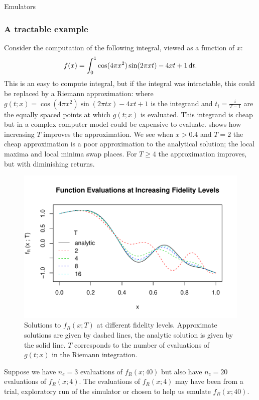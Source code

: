 \begin{chapter}{Emulators \label{Ch:Emulators}}
\subsubsection{A tractable example}
Consider the computation of the following integral, viewed as a function of $x$:
\begin{equation}
  f(x) = \int_0^1 \cos(4 \pi x^2)\sin(2 \pi xt) - 4xt + 1 \mathop{}\!\mathrm{d} t.
\end{equation}
This is an easy to compute integral, but if the integral was intractable, this could be replaced by a Riemann approximation:
where $g(t ; x) = \cos(4 \pi x^2)\sin(2 \pi t x) - 4xt + 1$ is the integrand and $t_i = \tfrac{i}{T-1}$ are the equally spaced points at which $g(t;x)$ is evaluated. This integrand is cheap but in a complex computer model could be expensive to evaluate.  shows how increasing $T$ improves the approximation. We see when $x>0.4$ and $T=2$ the cheap approximation is a poor approximation to the analytical solution; the local maxima and local minima swap places. For $T \geq 4$ the approximation improves, but with diminishing returns.
\begin{figure}[h]
  \centering
  \includegraphics{fig-emulators/fidelity.pdf}
  \caption{Solutions to $f_R(x;T)$ at different fidelity levels. Approximate solutions are given by dashed lines, the analytic solution is given by the solid line. $T$ corresponds to the number of evaluations of $g(t;x)$ in the Riemann integration.}
  \label{Fig:fidelity}
\end{figure}
Suppose we have $n_e = 3$ evaluations of $f_R(x; 40)$ but also have $n_c = 20$ evaluations of $f_R(x;4)$. The evaluations of $f_R(x;4)$ may have been from a trial, exploratory run of the simulator or chosen to help us emulate $f_R(x; 40)$.

\end{chapter}
